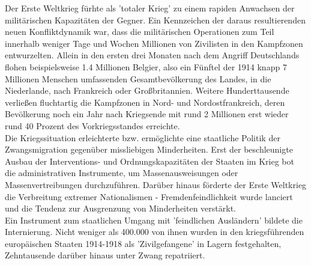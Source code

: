 \documentclass[letterpaper, 12pt]{article}
\begin{document}
Der Erste Weltkrieg fürhte als 'totaler Krieg' zu einem rapiden Anwachsen der militärischen Kapazitäten der Gegner. Ein Kennzeichen der daraus resultierenden neuen Konfliktdynamik war, dass die militärischen Operationen zum Teil innerhalb weniger Tage und Wochen Millionen von Zivilisten in den Kampfzonen entwurzelten. Allein in den ersten drei Monaten nach dem Angriff Deutschlands flohen beispielsweise 1.4 Millionen Belgier, also ein Fünftel der 1914 knapp 7 Millionen Menschen umfassenden Gesamtbevölkerung des Landes, in die Niederlande, nach Frankreich oder Großbritannien. Weitere Hunderttausende verließen fluchtartig die Kampfzonen in Nord- und Nordostfrankreich, deren Bevölkerung noch ein Jahr nach Kriegsende mit rund 2 Millionen erst wieder rund 40 Prozent des Vorkriegsstandes erreichte. \\
Die Kriegssituation erleichterte bzw. ermöglichte eine staatliche Politik der Zwangsmigration gegenüber missliebigen Minderheiten. Erst der beschleunigte Ausbau der Interventions- und Ordnungskapazitäten der Staaten im Krieg bot die administrativen Instrumente, um Massenausweisungen oder Massenvertreibungen durchzuführen. Darüber hinaus förderte der Erste Weltkrieg die Verbreitung extremer Nationalismen - Fremdenfeindlichkeit wurde lanciert und die Tendenz zur Ausgrenzung von Minderheiten verstärkt. \\
Ein Instrument zum staatlichen Umgang mit 'feindlichen Ausländern' bildete die Internierung. Nicht weniger als 400.000 von ihnen wurden in den kriegsführenden europäischen Staaten 1914-1918 als 'Zivilgefangene' in Lagern festgehalten, Zehntausende darüber hinaus unter Zwang repatriiert.

\clearpage


\end{document}
